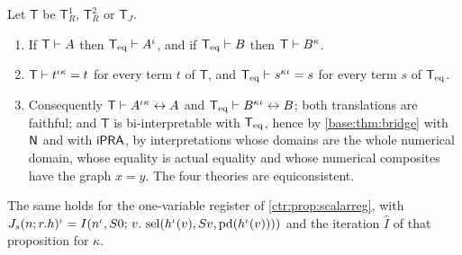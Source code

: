 \begin{theorem}\label{ctr:thm:transfer}
Let $\mathsf T$ be $\mathsf T_R^1$, $\mathsf T_R^2$ or $\mathsf T_J$.
\begin{enumerate}
\item If $\mathsf T\vdash A$ then $\mathsf{T}_{\mathrm{eq}}\vdash A^\iota$, and if $\mathsf{T}_{\mathrm{eq}}\vdash B$ then
$\mathsf T\vdash B^\kappa$.
\item $\mathsf T\vdash t^{\iota\kappa}=t$ for every term $t$ of $\mathsf T$, and
$\mathsf{T}_{\mathrm{eq}}\vdash s^{\kappa\iota}=s$ for every term $s$ of $\mathsf{T}_{\mathrm{eq}}$.
\item Consequently $\mathsf T\vdash A^{\iota\kappa}\leftrightarrow A$ and
$\mathsf{T}_{\mathrm{eq}}\vdash B^{\kappa\iota}\leftrightarrow B$; both translations are faithful; and
$\mathsf T$ is bi-interpretable with $\mathsf{T}_{\mathrm{eq}}$, hence by \cref{base:thm:bridge} with $\mathsf{N}$ and
with $\mathsf{iPRA}$, by interpretations whose domains are the whole numerical domain, whose
equality is actual equality and whose numerical composites have the graph $x=y$. The four
theories are equiconsistent.
\end{enumerate}
The same holds for the one-variable register of \cref{ctr:prop:scalarreg}, with
$J_s(n;r.h)^\iota=I(n^\iota,S 0;\,v.\,\operatorname{sel}(h^\iota(v),S v,\mathrm{pd}(h^\iota(v))))$
and the iteration $\widehat I$ of that proposition for $\kappa$.
\end{theorem}
